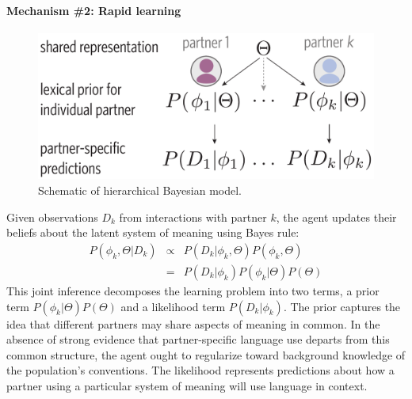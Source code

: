\paragraph{Mechanism \#2: Rapid learning}

\begin{figure}[t!]
\includegraphics[scale=0.4]{./figures/task1_model.pdf}
\vspace{1em}
\caption{Schematic of hierarchical Bayesian model.}
\label{fig:model_schematic}
\end{figure}

Given observations $D_k$ from interactions with partner $k$, the agent updates their beliefs about the latent system of meaning using Bayes rule:
\begin{equation}
\begin{array}{rcl}
\label{eq:joint_inference}
P(\phi_k, \Theta | D_k)  & \propto &  P(D_k | \phi_k, \Theta) P(\phi_k, \Theta) \\
                           & =   & P(D_k | \phi_k) P(\phi_k | \Theta) P(\Theta)
\end{array}
\end{equation}
This joint inference decomposes the learning problem into two terms, a prior term $P(\phi_k | \Theta)P(\Theta)$ and a likelihood term $P(D_k | \phi_k)$.
The prior captures the idea that different partners may share aspects of meaning in common.
In the absence of strong evidence that partner-specific language use departs from this common structure, the agent ought to regularize toward background knowledge of the population's conventions.
The likelihood represents predictions about how a partner using a particular system of meaning will use language in context.

